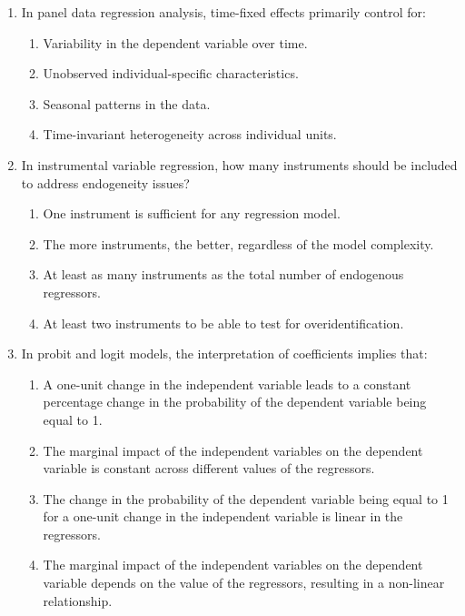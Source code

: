 \documentclass{article}
\begin{document}
\begin{enumerate}[label=\textbf{\arabic*.}]
    \item In panel data regression analysis, time-fixed effects primarily control for:
    \begin{enumerate}[label=\Alph*)]
        \item Variability in the dependent variable over time.
        \item Unobserved individual-specific characteristics.
        \item Seasonal patterns in the data.
        \item Time-invariant heterogeneity across individual units.
    \end{enumerate}

    \item In instrumental variable regression, how many instruments should be included to address endogeneity issues?
    \begin{enumerate}[label=\Alph*)]
        \item One instrument is sufficient for any regression model.
        \item The more instruments, the better, regardless of the model complexity.
        \item At least as many instruments as the total number of endogenous regressors.
        \item At least two instruments to be able to test for overidentification.
    \end{enumerate}

    \item In probit and logit models, the interpretation of coefficients implies that:
    \begin{enumerate}[label=\Alph*)]
        \item A one-unit change in the independent variable leads to a constant percentage change in the probability of the dependent variable being equal to 1.
        \item The marginal impact of the independent variables on the dependent variable is constant across different values of the regressors.
        \item The change in the probability of the dependent variable being equal to 1 for a one-unit change in the independent variable is linear in the regressors.
        \item The marginal impact of the independent variables on the dependent variable depends on the value of the regressors, resulting in a non-linear relationship.
    \end{enumerate}

\end{enumerate}
\end{document}
